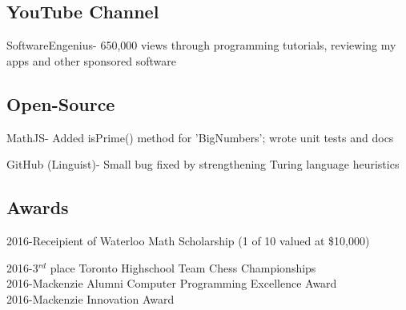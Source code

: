 \documentclass[]{deedy-resume-openfont}
\begin{document}
\begin{minipage}[t]{0.33\textwidth}
\subsection{YouTube Channel}
SoftwareEngenius- 650,000 views through programming tutorials, reviewing my apps and other sponsored software
\sectionsep

\vspace{2mm}

\subsection{Open-Source}
MathJS- Added isPrime() method for 'BigNumbers'; wrote unit tests and docs\\
\vspace{1mm}

GitHub (Linguist)- Small bug fixed by strengthening Turing language heuristics
\sectionsep
\vspace{2mm}

\subsection{Awards}


2016-Receipient of Waterloo Math Scholarship (1 of 10 valued at \$10,000) \\
\vspace{1mm}

2016-3$^{rd}$ place Toronto Highschool Team Chess Championships \\
\vspace{1mm}
2016-Mackenzie Alumni Computer Programming Excellence Award \\
\vspace{1mm}
2016-Mackenzie Innovation Award\\


\end{minipage}
\end{document}
